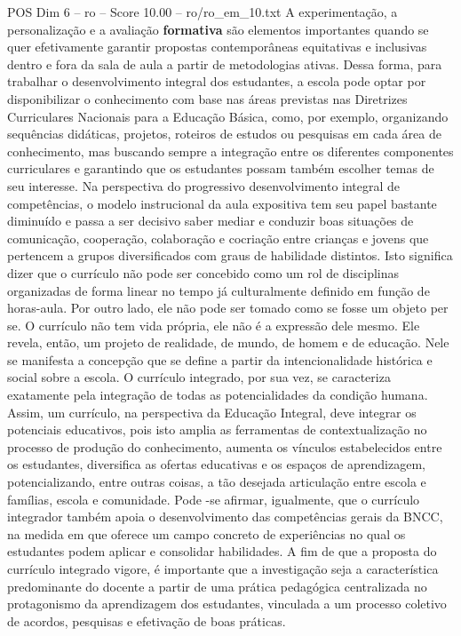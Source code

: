 \begin{textsample}{POS Dim 6 – ro – Score 10.00 – ro/ro\_em\_10.txt}
A experimentação, a personalização e a avaliação \textbf{formativa} são elementos importantes quando se quer efetivamente garantir propostas contemporâneas equitativas e inclusivas dentro e fora da sala de aula a partir de metodologias ativas.
Dessa forma, para trabalhar o desenvolvimento integral dos estudantes, a escola pode optar por disponibilizar o conhecimento com base nas áreas previstas nas Diretrizes Curriculares Nacionais para a Educação Básica, como, por exemplo, organizando sequências didáticas, projetos, roteiros de estudos ou pesquisas em cada área de conhecimento, mas buscando sempre a integração entre os diferentes componentes curriculares e garantindo que os estudantes possam também escolher temas de seu interesse.
Na perspectiva do progressivo desenvolvimento integral de competências, o modelo instrucional da aula expositiva tem seu papel bastante diminuído e passa a ser decisivo saber mediar e conduzir boas situações de comunicação, cooperação, colaboração e cocriação entre crianças e jovens que pertencem a grupos diversificados com graus de habilidade distintos.
Isto significa dizer que o currículo não pode ser concebido como um rol de disciplinas organizadas de forma linear no tempo já culturalmente definido em função de horas-aula.
Por outro lado, ele não pode ser tomado como se fosse um objeto per se.
O currículo não tem vida própria, ele não é a expressão dele mesmo.
Ele revela, então, um projeto de realidade, de mundo, de homem e de educação.
Nele se manifesta a concepção que se define a partir da intencionalidade histórica e social sobre a escola.
O currículo integrado, por sua vez, se caracteriza exatamente pela integração de todas as potencialidades da condição humana.
Assim, um currículo, na perspectiva da Educação Integral, deve integrar os potenciais educativos, pois isto amplia as ferramentas de contextualização no processo de produção do conhecimento, aumenta os vínculos estabelecidos entre os estudantes, diversifica as ofertas educativas e os espaços de aprendizagem, potencializando, entre outras coisas, a tão desejada articulação entre escola e famílias, escola e comunidade.
Pode -se afirmar, igualmente, que o currículo integrador também apoia o desenvolvimento das competências gerais da BNCC, na medida em que oferece um campo concreto de experiências no qual os estudantes podem aplicar e consolidar habilidades.
A fim de que a proposta do currículo integrado vigore, é importante que a investigação seja a característica predominante do docente a partir de uma prática pedagógica centralizada no protagonismo da aprendizagem dos estudantes, vinculada a um processo coletivo de acordos, pesquisas e efetivação de boas práticas.

\end{textsample}
